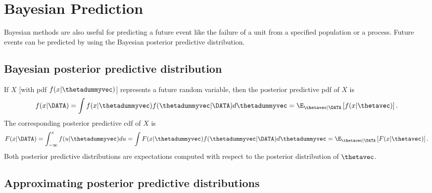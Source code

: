 \section{Bayesian Prediction}

Bayesian methods are also useful for predicting a future event
like the failure of a unit from a specified population or a process.
Future events can be predicted by using the Bayesian posterior predictive
distribution.

\subsection{Bayesian posterior predictive distribution}
If $X$ [with pdf $f(x|\thetadummyvec)$]
represents a future random variable, then
the posterior predictive pdf of $X$ is
\begin{equation}
\label{equation:bayes.pred.pdf}
f(x | \DATA)=
\int f(x| \thetadummyvec) f(\thetadummyvec | \DATA)
d \thetadummyvec = \E_{\thetavec|\DATA} \left [f(x| \thetavec)\right ].
\end{equation}
The corresponding posterior predictive cdf of $X$ is
\begin{equation}
\label{equation:bayes.pred.cdf}
F(x | \DATA)=\int_{-\infty}^{x} f(u| \thetadummyvec) d u
=
\int F(x| \thetadummyvec) f(\thetadummyvec |\DATA)
d \thetadummyvec=
\E_{\thetavec|\DATA} \left [F(x|\thetavec) \right ].
\end{equation}
Both posterior predictive distributions
are expectations computed with respect to the
posterior distribution of $\thetavec$.

\subsection{Approximating posterior predictive distributions}

